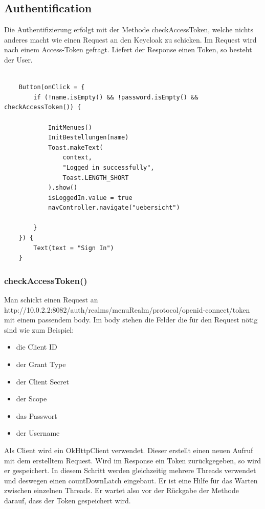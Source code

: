 \subsection{Authentification}
Die Authentifizierung erfolgt mit der Methode checkAccessToken, welche nichts anderes macht wie einen Request an den Keycloak zu schicken.
Im Request wird nach einem Access-Token gefragt.
Liefert der Response einen Token, so besteht der User.

\begin{lstlisting}

    Button(onClick = {
        if (!name.isEmpty() && !password.isEmpty() && checkAccessToken()) {

            InitMenues()
            InitBestellungen(name)
            Toast.makeText(
                context,
                "Logged in successfully",
                Toast.LENGTH_SHORT
            ).show()
            isLoggedIn.value = true
            navController.navigate("uebersicht")

        }
    }) {
        Text(text = "Sign In")
    }

\end{lstlisting}




\subsubsection{checkAccessToken()}

Man schickt einen Request an http://10.0.2.2:8082/auth/realms/menuRealm/protocol/openid-connect/token mit einem passendem body.
Im body stehen die Felder die für den Request nötig sind wie zum Beispiel:
\begin{itemize}
    \item die Client ID
    \item der Grant Type 
    \item der Client Secret
    \item der Scope
    \item das Passwort
    \item der Username
\end{itemize}

Als Client wird ein OkHttpClient verwendet. Dieser erstellt einen neuen Aufruf mit dem erstelltem Request. 
Wird im Response ein Token zurückgegeben, so wird er gespeichert. In diesem Schritt werden gleichzeitig mehrere Threads verwendet und deswegen
einen countDownLatch eingebaut. Er ist eine Hilfe für das Warten zwischen einzelnen Threads.
Er wartet also vor der Rückgabe der Methode darauf, dass der Token gespeichert wird. 


